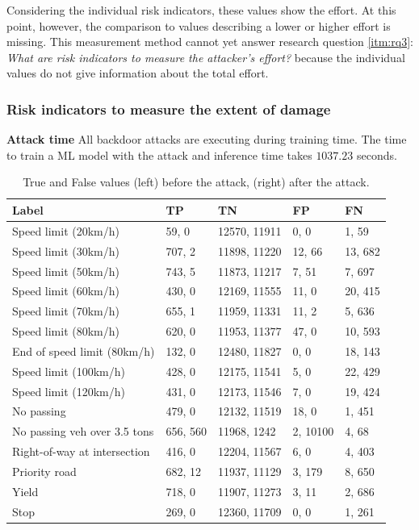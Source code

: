 Considering the individual risk indicators, these values show the effort. At this point, however, the comparison to values describing a lower or higher effort is missing. This measurement method cannot yet answer research question \ref{itm:rq3}: \textit{What are risk indicators to measure the attacker's effort?} because the individual values do not give information about the total effort.

\subsubsection*{Risk indicators to measure the extent of damage}

\noindent\textbf{Attack time} All backdoor attacks are executing during training time. The time to train a ML model with the attack and inference time takes $1037.23$ seconds. \\

\begin{table}[ht!]
\centering
  \begin{tabular}{| l | p{1.5cm} | p{2cm} | p{1.5cm} | p{1.5cm} |}
  \hline
  \rowcolor{lightgray} Label & TP & TN & FP & FN \\ [0.5ex]
  \hline
  Speed limit (20km/h) & 59, 0 & 12570, 11911 & 0, 0 & 1, 59\\
  \hline
  Speed limit (30km/h) & 707, 2 & 11898, 11220 & 12, 66 & 13, 682\\
  \hline
  Speed limit (50km/h) & 743, 5 & 11873, 11217 & 7, 51 & 7, 697\\
  \hline
  Speed limit (60km/h) & 430, 0 & 12169, 11555 & 11, 0 & 20, 415\\
  \hline
  Speed limit (70km/h) & 655, 1 & 11959, 11331 & 11, 2 & 5, 636\\
  \hline
  Speed limit (80km/h) & 620, 0 & 11953, 11377 & 47, 0 & 10, 593\\
  \hline
  End of speed limit (80km/h) & 132, 0 & 12480, 11827 & 0, 0 & 18, 143\\
  \hline
  Speed limit (100km/h) & 428, 0 & 12175, 11541 & 5, 0 & 22, 429\\
  \hline
  Speed limit (120km/h) & 431, 0 & 12173, 11546 & 7, 0 & 19, 424\\
  \hline
  No passing & 479, 0 & 12132, 11519 & 18, 0 & 1, 451\\
  \hline
  No passing veh over 3.5 tons & 656, 560 & 11968, 1242 & 2, 10100 & 4, 68\\
  \hline
  Right-of-way at intersection & 416, 0 & 12204, 11567 & 6, 0 & 4, 403\\
  \hline
  Priority road & 682, 12 & 11937, 11129 & 3, 179 & 8, 650\\
  \hline
  Yield & 718, 0 & 11907, 11273 & 3, 11 & 2, 686\\
  \hline
  Stop & 269, 0 & 12360, 11709 & 0, 0 & 1, 261\\
  \hline
  \end{tabular}
  \caption{True and False values (left) before the attack, (right) after the attack.}
  \label{tab:pos_neg_1}
\end{table}

